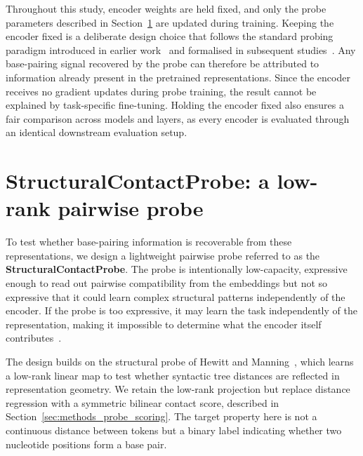 \documentclass[logo,bsc,singlespacing,parskip]{infthesis}
\begin{document}
Throughout this study, encoder weights are held fixed, and only the probe parameters described in Section~\ref{sec:methods_probe} are updated during training. Keeping the encoder fixed is a deliberate design
choice that follows the standard probing paradigm introduced in earlier work~\citep{alain2017understanding} and formalised in subsequent studies~\citep{hewitt2019structural,belinkov2022probing}. Any
base-pairing signal recovered by the probe can therefore be attributed
to information already present in the pretrained representations. Since the encoder receives no gradient updates during probe training, the result cannot be explained by task-specific fine-tuning. Holding the encoder fixed also ensures a fair
comparison across models and layers, as every encoder is evaluated
through an identical downstream evaluation setup.

\section{StructuralContactProbe: a low-rank pairwise probe}
\label{sec:methods_probe}

To test whether base-pairing information is recoverable from these representations, we design a lightweight pairwise probe referred to as the \textbf{StructuralContactProbe}. The probe is intentionally low-capacity, expressive enough to read out pairwise compatibility from the embeddings but not so expressive that it could learn complex structural patterns independently of the encoder. If the probe is too expressive, it may learn the task independently of the representation, making it impossible to determine what the encoder itself contributes~\citep{pimentel2020pareto, hewitt2019designing,belinkov2022probing}.

The design builds on the structural probe of Hewitt and Manning~\citep{hewitt2019structural}, which learns a low-rank linear map to test whether syntactic tree distances are reflected in representation geometry. We retain the low-rank projection but replace distance regression with a symmetric bilinear contact score, described in Section~\ref{sec:methods_probe_scoring}. The target property here is not a continuous distance between tokens but a binary label indicating whether two nucleotide positions form a base pair.
\end{document}
